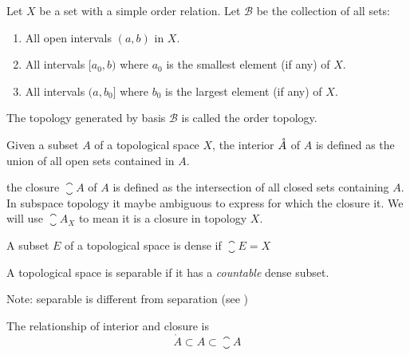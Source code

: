 \begin{definition}
    Let $X$ be a set with a simple order relation. Let $\mathcal{B}$ be the collection of all sets:
    \begin{enumerate}
        \item All open intervals $(a,b)$ in $X$.
        \item All intervals $[a_0, b)$ where $a_0$ is the smallest element (if any) of $X$.
        \item All intervals $(a, b_0]$ where $b_0$ is the largest element (if any) of $X$.
    \end{enumerate}
    The topology generated by basis $\mathcal{B}$ is called the order topology.
\end{definition}



\begin{definition}
    Given a subset $A$ of a topological space $X$, the interior $\mathring{A}$ of $A$ is defined as the union of all open sets contained in $A$.
\end{definition}

\begin{definition}
    the closure $\closure{A}$ of $A$ is defined as the intersection of all closed sets containing $A$. In subspace topology it maybe ambiguous to express for which the closure it. We will use $\closure{A}_X$ to mean it is a closure in topology $X$.
\end{definition}


\begin{definition}
    A subset $E$ of a topological space is dense if $\closure{E} = X$
\end{definition}

\begin{definition}\label{separable}
    A topological space is separable if it has a \emph{countable} dense subset.
    
    Note: separable is different from separation (see )
\end{definition}



\begin{theorem}
    The relationship of interior and closure is
\begin{equation}
    \mathring{A} \subset A \subset \closure{A}
\end{equation}
\end{theorem}



